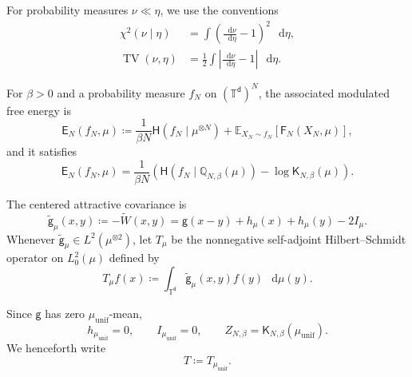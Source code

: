 \documentclass[11pt,reqno]{amsart}
\numberwithin{equation}{section}
\theoremstyle{plain}
\theoremstyle{definition}
\renewcommand{\d}{\mathsf d}
\newcommand{\dd}{\mathop{}\!\mathrm d}
\newcommand{\T}{\mathbb T}
\newcommand{\E}{\mathbb E}
\newcommand{\Q}{\mathbb Q}
\newcommand{\TV}{\operatorname{TV}}
\newcommand{\be}{\beta}
\newcommand{\g}{\mathsf g}
\newcommand{\K}{\mathsf K}
\newcommand{\Fr}{\mathsf F}
\newcommand{\Hr}{\mathsf H}
\newcommand{\Er}{\mathsf E}
\newcommand{\tl}{\widetilde}
\newcommand{\muunif}{\mu_{\mathrm{unif}}}
\newcommand{\XN}{X_N}
\begin{document}
For probability measures $\nu\ll\eta$, we use the conventions
\begin{align}
 \chi^2(\nu\mid\eta)
 &=\int\left(\frac{\dd\nu}{\dd\eta}-1\right)^2\,\dd\eta,
 \label{eq:homogeneous-chi-square-convention}\\
 \TV(\nu,\eta)
 &=\frac12\int\left|\frac{\dd\nu}{\dd\eta}-1\right|\,\dd\eta.
 \label{eq:homogeneous-total-variation-convention}
\end{align}

For $\be>0$ and a probability measure $f_N$ on $(\T^{\d})^N$, the associated modulated free energy is
\begin{equation}
 \Er_N(f_N,\mu)
 \coloneqq\frac1{\be N}\Hr(f_N\mid\mu^{\otimes N})
 +\E_{\XN\sim f_N}[\Fr_N(\XN,\mu)],
 \label{eq:modulated-free-energy}
\end{equation}
and it satisfies
\begin{equation}
 \Er_N(f_N,\mu)
 =\frac1{\be N}\left(
 \Hr(f_N\mid\Q_{N,\be}(\mu))-\log\K_{N,\be}(\mu)
 \right).
 \label{eq:modulated-free-energy-rewriting}
\end{equation}

The centered attractive covariance is
\begin{equation}
 \tl{\g}_{\mu}(x,y)\coloneqq-\tl W(x,y)
 =\g(x-y)+h_{\mu}(x)+h_{\mu}(y)-2I_{\mu}.
 \label{eq:hoeffding-centered-kernel}
\end{equation}
Whenever $\tl{\g}_{\mu}\in L^2(\mu^{\otimes2})$, let $T_{\mu}$ be the nonnegative self-adjoint Hilbert--Schmidt operator on $L_0^2(\mu)$ defined by
\begin{equation}
 T_{\mu}f(x)\coloneqq\int_{\T^{\d}}\tl{\g}_{\mu}(x,y)f(y)\,\dd\mu(y).
 \label{eq:positive-covariance-operator}
\end{equation}

Since $\g$ has zero $\muunif$-mean,
\begin{equation}
 h_{\muunif}=0,
 \qquad
 I_{\muunif}=0,
 \qquad
 Z_{N,\be}=\K_{N,\be}(\muunif).
 \label{eq:uniform-specialization}
\end{equation}
We henceforth write
\begin{equation}
 T\coloneqq T_{\muunif}.
 \label{eq:uniform-operator-abbreviation}
\end{equation}
\end{document}
